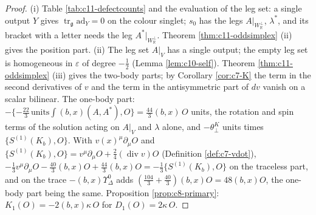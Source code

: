 \begin{proof}
(i) Table \ref{tab:c11-defectcounts} and the evaluation of the leg set: a single output $Y$ gives $\operatorname{tr}_{\mathfrak g}\mathrm{ad}_Y=0$ on the colour singlet; $s_0$ has the legs $A|_{W_{\mathbb R}^\perp}$, $\lambda^*$, and its bracket with a letter needs the leg $A^*|_{W_{\mathbb R}^\perp}$. Theorem \ref{thm:c11-oddsimplex} (ii) gives the position part. (ii) The leg set $A|_V$ has a single output; the empty leg set is homogeneous in $\varepsilon$ of degree $-\tfrac12$ (Lemma \ref{lem:c10-self}). Theorem \ref{thm:c11-oddsimplex} (iii) gives the two-body parts; by Corollary \ref{cor:c7-K} the term in the second derivatives of $v$ and the term in the antisymmetric part of $dv$ vanish on a scalar bilinear. The one-body part: $-\{-\tfrac{22}3\,\text{units}\int(b,x)(A,A^*),O\}=\tfrac{44}3(b,x)\,O$ units, the rotation and spin terms of the solution acting on $A|_V$ and $\lambda$ alone, and $-\theta^K_\perp$ units times $\{S^{(1)}(K_b),O\}$. With $v(x)^\mu\partial_\mu O$ and $\{S^{(1)}(K_b),O\}=v^\mu\partial_\mu O+\tfrac24(\operatorname{div}v)O$ (Definition \ref{def:c7-vdot}), $-\tfrac13v^\mu\partial_\mu O-\tfrac{40}3(b,x)O+\tfrac{44}3(b,x)O=-\tfrac13\{S^{(1)}(K_b),O\}$ on the traceless part, and on the trace $-(b,x)\Upsilon^0_\Delta$ adds $(\tfrac{104}3+\tfrac{40}3)(b,x)O=48(b,x)O$, the one-body part being the same. Proposition \ref{prop:c8-primary}: $K_1(O)=-2(b,x)\kappa\,O$ for $D_1(O)=2\kappa\,O$.
\end{proof}
